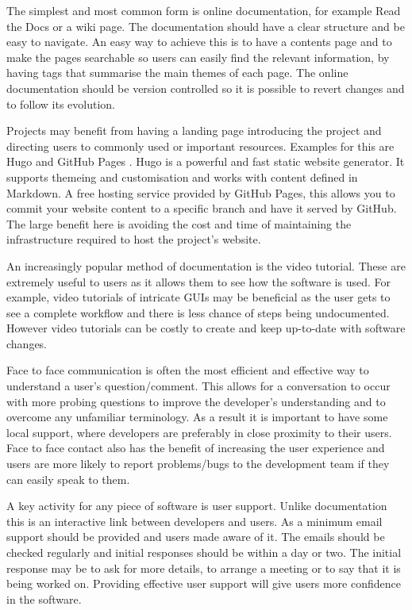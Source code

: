 \documentclass[jnr]{iosart2x}
\begin{document}
\begin{itemzie}
The simplest and most common form is online documentation, for example Read the Docs \cite{Read_The_Docs} or a wiki page.
The documentation should have a clear structure and be easy to navigate.
An easy way to achieve this is to have a contents page and to make the pages searchable so users can easily find the relevant information, by having tags that summarise the main themes of each page.
The online documentation should be version controlled so it is possible to revert changes and to follow its evolution.

Projects may benefit from having a landing page introducing the project and directing users to commonly used or important resources.
Examples for this are Hugo \cite{Hugo} and GitHub Pages \cite{GitHub_Pages}.
Hugo is a powerful and fast static website generator.
It supports themeing and customisation and works with content defined in Markdown.
A free hosting service provided by GitHub Pages, this allows you to commit your website content to a specific branch and have it served by GitHub.
The large benefit here is avoiding the cost and time of maintaining the infrastructure required to host the project's website.

An increasingly popular method of documentation is the video tutorial.
These are extremely useful to users as it allows them to see how the software is used.
For example, video tutorials of intricate GUIs may be beneficial as the user gets to see a complete workflow and there is less chance of steps being undocumented.
However video tutorials can be costly to create and keep up-to-date with software changes.

Face to face communication is often the most efficient and effective way to understand a user's question/comment.
This allows for a conversation to occur with more probing questions to improve the developer's understanding and to overcome any unfamiliar terminology.
As a result it is important to have some local support, where developers are preferably in close proximity to their users.
Face to face contact also has the benefit of increasing the user experience and users are more likely to report problems/bugs to the development team if they can easily speak to them.

A key activity for any piece of software is user support.
Unlike documentation this is an interactive link between developers and users.
As a minimum email support should be provided and users made aware of it.
The emails should be checked regularly and initial responses should be within a day or two.
The initial response may be to ask for more details, to arrange a meeting or to say that it is being worked on.
Providing effective user support will give users more confidence in the software.


\end{itemzie}
\end{document}
